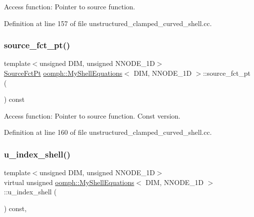Access function\+: Pointer to source function. 



Definition at line 157 of file unstructured\+\_\+clamped\+\_\+curved\+\_\+shell.\+cc.

\mbox{\label{classoomph_1_1MyShellEquations_a3cf0287a7fcc34f88c011805ae18fdcb}} 
\subsubsection{\texorpdfstring{source\+\_\+fct\+\_\+pt()}{source\_fct\_pt()}\hspace{0.1cm}{\footnotesize\ttfamily [2/2]}}
{\footnotesize\ttfamily template$<$unsigned D\+IM, unsigned N\+N\+O\+D\+E\+\_\+1D$>$ \\
\hyperlink{classoomph_1_1MyShellEquations_a056d2488b6e65787f5c9935a321b7a9b}{Source\+Fct\+Pt} \hyperlink{classoomph_1_1MyShellEquations}{oomph\+::\+My\+Shell\+Equations}$<$ D\+IM, N\+N\+O\+D\+E\+\_\+1D $>$\+::source\+\_\+fct\+\_\+pt (\begin{DoxyParamCaption}{ }\end{DoxyParamCaption}) const\hspace{0.3cm}{\ttfamily [inline]}}



Access function\+: Pointer to source function. Const version. 



Definition at line 160 of file unstructured\+\_\+clamped\+\_\+curved\+\_\+shell.\+cc.

\mbox{\label{classoomph_1_1MyShellEquations_a983c9be2c162eccec2f41c391722f0aa}} 
\subsubsection{\texorpdfstring{u\+\_\+index\+\_\+shell()}{u\_index\_shell()}}
{\footnotesize\ttfamily template$<$unsigned D\+IM, unsigned N\+N\+O\+D\+E\+\_\+1D$>$ \\
virtual unsigned \hyperlink{classoomph_1_1MyShellEquations}{oomph\+::\+My\+Shell\+Equations}$<$ D\+IM, N\+N\+O\+D\+E\+\_\+1D $>$\+::u\+\_\+index\+\_\+shell (\begin{DoxyParamCaption}{ }\end{DoxyParamCaption}) const\hspace{0.3cm}{\ttfamily [inline]}, {\ttfamily [virtual]}}



